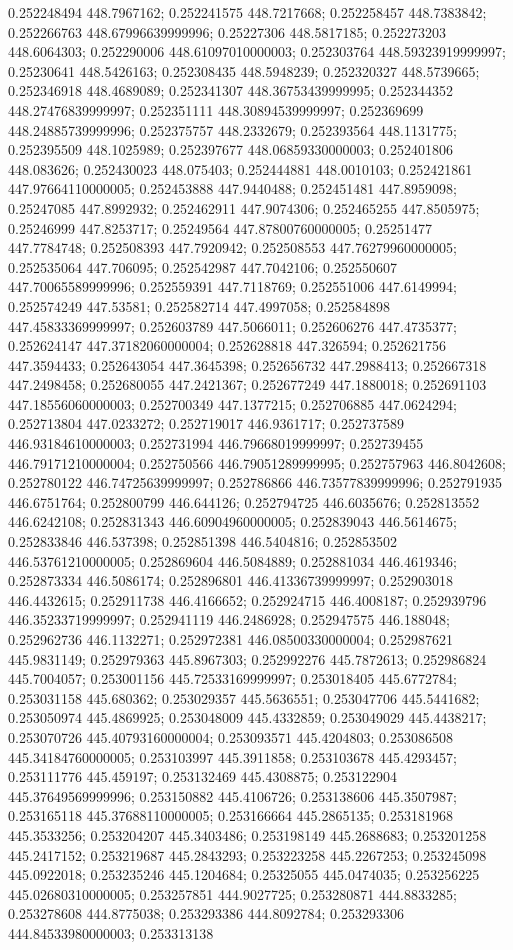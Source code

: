 0.252248494 448.7967162; 0.252241575 448.7217668; 0.252258457 448.7383842; 0.252266763 448.67996639999996; 0.25227306 448.5817185; 0.252273203 448.6064303; 0.252290006 448.61097010000003; 0.252303764 448.59323919999997; 0.25230641 448.5426163; 0.252308435 448.5948239; 0.252320327 448.5739665; 0.252346918 448.4689089; 0.252341307 448.36753439999995; 0.252344352 448.27476839999997; 0.252351111 448.30894539999997; 0.252369699 448.24885739999996; 0.252375757 448.2332679; 0.252393564 448.1131775; 0.252395509 448.1025989; 0.252397677 448.06859330000003; 0.252401806 448.083626; 0.252430023 448.075403; 0.252444881 448.0010103; 0.252421861 447.97664110000005; 0.252453888 447.9440488; 0.252451481 447.8959098; 0.25247085 447.8992932; 0.252462911 447.9074306; 0.252465255 447.8505975; 0.25246999 447.8253717; 0.25249564 447.87800760000005; 0.25251477 447.7784748; 0.252508393 447.7920942; 0.252508553 447.76279960000005; 0.252535064 447.706095; 0.252542987 447.7042106; 0.252550607 447.70065589999996; 0.252559391 447.7118769; 0.252551006 447.6149994; 0.252574249 447.53581; 0.252582714 447.4997058; 0.252584898 447.45833369999997; 0.252603789 447.5066011; 0.252606276 447.4735377; 0.252624147 447.37182060000004; 0.252628818 447.326594; 0.252621756 447.3594433; 0.252643054 447.3645398; 0.252656732 447.2988413; 0.252667318 447.2498458; 0.252680055 447.2421367; 0.252677249 447.1880018; 0.252691103 447.18556060000003; 0.252700349 447.1377215; 0.252706885 447.0624294; 0.252713804 447.0233272; 0.252719017 446.9361717; 0.252737589 446.93184610000003; 0.252731994 446.79668019999997; 0.252739455 446.79171210000004; 0.252750566 446.79051289999995; 0.252757963 446.8042608; 0.252780122 446.74725639999997; 0.252786866 446.73577839999996; 0.252791935 446.6751764; 0.252800799 446.644126; 0.252794725 446.6035676; 0.252813552 446.6242108; 0.252831343 446.60904960000005; 0.252839043 446.5614675; 0.252833846 446.537398; 0.252851398 446.5404816; 0.252853502 446.53761210000005; 0.252869604 446.5084889; 0.252881034 446.4619346; 0.252873334 446.5086174; 0.252896801 446.41336739999997; 0.252903018 446.4432615; 0.252911738 446.4166652; 0.252924715 446.4008187; 0.252939796 446.35233719999997; 0.252941119 446.2486928; 0.252947575 446.188048; 0.252962736 446.1132271; 0.252972381 446.08500330000004; 0.252987621 445.9831149; 0.252979363 445.8967303; 0.252992276 445.7872613; 0.252986824 445.7004057; 0.253001156 445.72533169999997; 0.253018405 445.6772784; 0.253031158 445.680362; 0.253029357 445.5636551; 0.253047706 445.5441682; 0.253050974 445.4869925; 0.253048009 445.4332859; 0.253049029 445.4438217; 0.253070726 445.40793160000004; 0.253093571 445.4204803; 0.253086508 445.34184760000005; 0.253103997 445.3911858; 0.253103678 445.4293457; 0.253111776 445.459197; 0.253132469 445.4308875; 0.253122904 445.37649569999996; 0.253150882 445.4106726; 0.253138606 445.3507987; 0.253165118 445.37688110000005; 0.253166664 445.2865135; 0.253181968 445.3533256; 0.253204207 445.3403486; 0.253198149 445.2688683; 0.253201258 445.2417152; 0.253219687 445.2843293; 0.253223258 445.2267253; 0.253245098 445.0922018; 0.253235246 445.1204684; 0.25325055 445.0474035; 0.253256225 445.02680310000005; 0.253257851 444.9027725; 0.253280871 444.8833285; 0.253278608 444.8775038; 0.253293386 444.8092784; 0.253293306 444.84533980000003; 0.253313138 